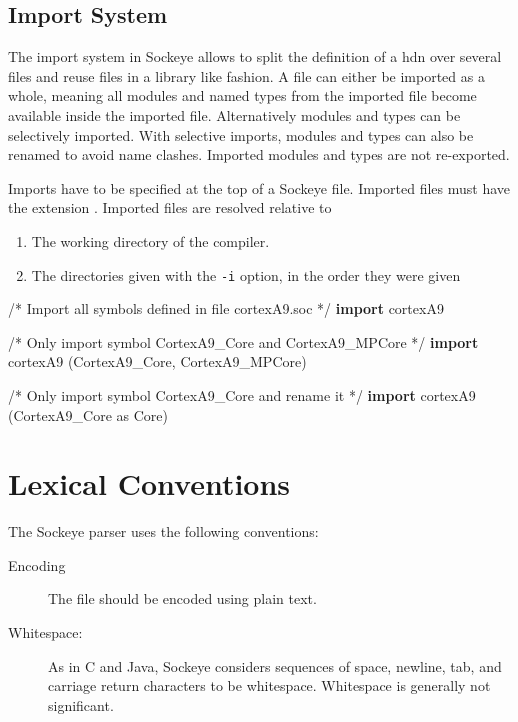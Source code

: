 \documentclass[a4paper,11pt,twoside]{report}
\begin{document}
{{{\section{Import System}
\label{sec:imports}
The import system in Sockeye allows to split the definition of a \gls{hdn} over several files and reuse files in a library like fashion.
A file can either be imported as a whole, meaning all modules and named types from the imported file become available inside the imported file.
Alternatively modules and types can be selectively imported.
With selective imports, modules and types can also be renamed to avoid name clashes.
Imported modules and types are not re-exported.

Imports have to be specified at the top of a Sockeye file.
Imported files must have the extension .
Imported files are resolved relative to
\begin{enumerate}
  \item The working directory of the compiler.
  \item The directories given with the \verb|-i| option, in the order they were given
\end{enumerate}

\begin{example}
/* Import all symbols defined in file cortexA9.soc */
\textbf{import} cortexA9

/* Only import symbol CortexA9_Core and CortexA9_MPCore */
\textbf{import} cortexA9 (CortexA9_Core, CortexA9_MPCore)

/* Only import symbol CortexA9_Core and rename it */
\textbf{import} cortexA9 (CortexA9_Core as Core)
\end{example}

\chapter{Lexical Conventions}
\label{chap:lexer}

The Sockeye parser uses the following conventions:

\begin{description}
\item[Encoding] The file should be encoded using plain text.
\item[Whitespace:]  As in C and Java, Sockeye considers sequences of
  space, newline, tab, and carriage return characters to be
  whitespace.  Whitespace is generally not significant. 


\end{description}}}}
\end{document}

